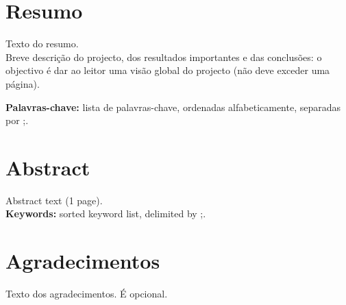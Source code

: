 \documentclass[a4paper,openright,twoside,11pt]{report}
\begin{document}
\cleardoublepage\newpage
\chapter*{Resumo}
Texto do resumo.\\

Breve descrição do projecto, dos resultados importantes e das conclusões: o objectivo é dar ao leitor uma visão global do projecto (não deve exceder uma página). 

{\bf Palavras-chave:} lista de palavras-chave, ordenadas alfabeticamente, separadas por ;.

\cleardoublepage\newpage
\chapter*{Abstract}
Abstract text (1 page).\\

{\bf Keywords:} sorted keyword list, delimited by ;.

\cleardoublepage\newpage
\chapter*{Agradecimentos}
Texto dos agradecimentos. É opcional.\\

\cleardoublepage\newpage
\tableofcontents
\cleardoublepage

\listoffigures
\cleardoublepage

\listoftables
\cleardoublepage

\setcounter{page}{1}

%

%

%

%

%




\appendix

%

%
\end{document}
